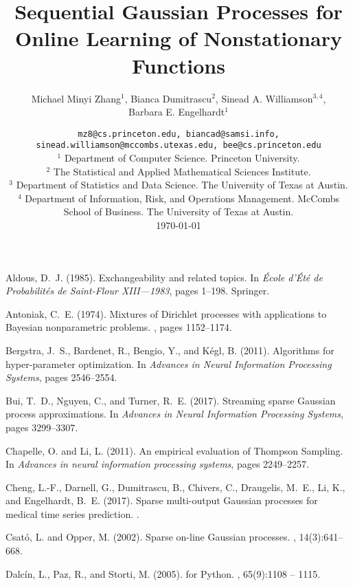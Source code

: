 \documentclass[12pt,letterpaper]{article}
\author{Michael Minyi Zhang$ ^{1} $, Bianca Dumitrascu$^{2}$, Sinead A. Williamson$ ^{3,4} $,\\ 
	Barbara E. Engelhardt$ ^{1} $}
\title{Sequential Gaussian Processes for Online Learning of Nonstationary Functions}
\date{\texttt{mz8@cs.princeton.edu, biancad@samsi.info, sinead.williamson@mccombs.utexas.edu, bee@cs.princeton.edu}\\
	$^{1}$ Department of Computer Science. Princeton University.\\
	$^{2}$ The Statistical and Applied Mathematical Sciences Institute.\\
	$^{3}$ Department of Statistics and Data Science. The University of Texas at Austin.\\
	$^{4}$ Department of Information, Risk, and Operations Management. McCombs School of Business. The University of Texas at Austin.\\
	\vspace{2em} 
	\today}
\begin{document}
	\maketitle
	\begin{abstract}
		
	\end{abstract}
	
	
	
	
	
	
	\begin{thebibliography}{}

Aldous, D.~J. (1985).
\newblock Exchangeability and related topics.
\newblock In {\em {\'E}cole d'{\'E}t{\'e} de Probabilit{\'e}s de Saint-Flour
  XIII—1983}, pages 1--198. Springer.

Antoniak, C.~E. (1974).
\newblock Mixtures of {D}irichlet processes with applications to {B}ayesian
  nonparametric problems.
, pages 1152--1174.

Bergstra, J.~S., Bardenet, R., Bengio, Y., and K{\'e}gl, B. (2011).
\newblock Algorithms for hyper-parameter optimization.
\newblock In {\em Advances in Neural Information Processing Systems}, pages
  2546--2554.

Bui, T.~D., Nguyen, C., and Turner, R.~E. (2017).
\newblock Streaming sparse {G}aussian process approximations.
\newblock In {\em Advances in Neural Information Processing Systems}, pages
  3299--3307.

Chapelle, O. and Li, L. (2011).
\newblock An empirical evaluation of {T}hompson {S}ampling.
\newblock In {\em Advances in neural information processing systems}, pages
  2249--2257.

Cheng, L.-F., Darnell, G., Dumitrascu, B., Chivers, C., Draugelis, M.~E., Li,
  K., and Engelhardt, B.~E. (2017).
\newblock Sparse multi-output {G}aussian processes for medical time series
  prediction.
.

Csat{\'o}, L. and Opper, M. (2002).
\newblock Sparse on-line {G}aussian processes.
, 14(3):641--668.

Dalc\'{i}n, L., Paz, R., and Storti, M. (2005).
 for {P}ython.
, 65(9):1108 --
  1115.


\end{thebibliography}
\end{document}
